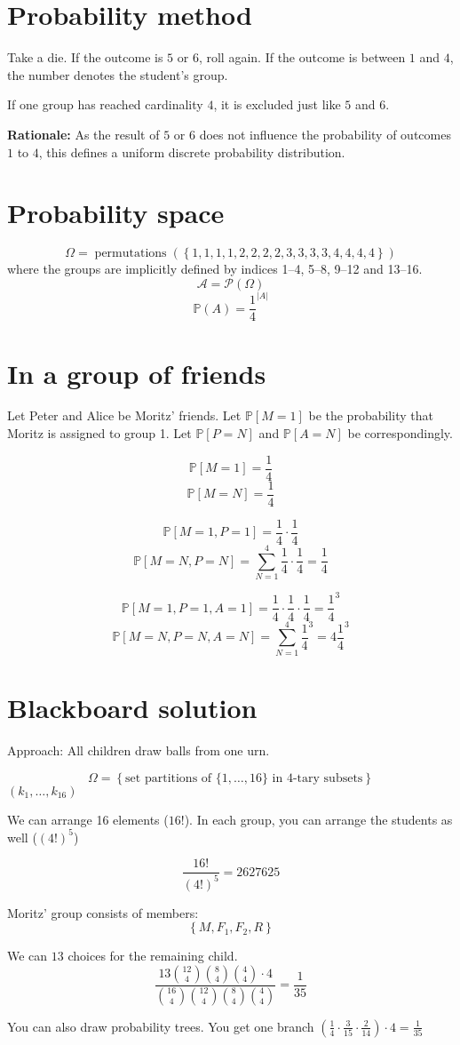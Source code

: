 \documentclass{article}
\newcommand\set[1]{\left\{#1\right\}}
\begin{document}
\section{Probability method}

Take a die. If the outcome is $5$ or $6$, roll again.
If the outcome is between $1$ and $4$, the number denotes the student's group.

If one group has reached cardinality $4$, it is excluded just like $5$ and $6$.

\textbf{Rationale:} As the result of $5$ or $6$ does not influence
the probability of outcomes $1$ to $4$, this defines a uniform discrete probability distribution.

\section{Probability space}

\[ \Omega = \operatorname{permutations}(\set{1,1,1,1,2,2,2,2,3,3,3,3,4,4,4,4}) \]
where the groups are implicitly defined by indices 1--4, 5--8, 9--12 and 13--16.
\[ \mathcal A = \mathcal P(\Omega) \]
\[ \mathbb P(A) = \frac14^{|A|} \]

\section{In a group of friends}

Let Peter and Alice be Moritz' friends.
Let $\mathbb P[M=1]$ be the probability that Moritz is assigned to group 1.
Let $\mathbb P[P=N]$ and $\mathbb P[A=N]$ be correspondingly.

\[ \mathbb P[M=1] = \frac14 \]
\[ \mathbb P[M=N] = \frac14 \]

\[ \mathbb P[M=1, P=1] = \frac14 \cdot \frac14 \]
\[ \mathbb P[M=N, P=N] = \sum_{N=1}^4 \frac14 \cdot \frac14 = \frac14 \]

\[ \mathbb P[M=1, P=1, A=1] = \frac14 \cdot \frac14 \cdot \frac14 = \frac14^3 \]
\[ \mathbb P[M=N, P=N, A=N] = \sum_{N=1}^4 \frac14^3 = 4 \frac14^3 \]

\section{Blackboard solution}

Approach: All children draw balls from one urn.

\[ \Omega = \set{\text{set partitions of $\{1, \dots, 16\}$ in $4$-tary subsets}} \]
$(k_1, \dots, k_{16})$

We can arrange 16 elements ($16!$).
In each group, you can arrange the students as well ($(4!)^5$)

\[ \frac{16!}{(4!)^5} = 2627625 \]

Moritz' group consists of members:
\[ \set{M, F_1, F_2, R} \]

We can $13$ choices for the remaining child.
\[ \frac{13 {12 \choose 4} {8 \choose 4} {4 \choose 4} \cdot 4}{{16 \choose 4} {12 \choose 4} {8 \choose 4} {4 \choose 4}} = \frac{1}{35} \]

You can also draw probability trees.
You get one branch $\left(\frac14 \cdot \frac3{15} \cdot \frac2{14}\right) \cdot 4 = \frac1{35}$
\end{document}
